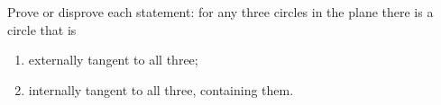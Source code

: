 Prove or disprove each statement: for any three circles in the plane there is a circle that is
\begin{enumerate}
\item[(a)] externally tangent to all three;
\item[(b)] internally tangent to all three, containing them.
\end{enumerate}
